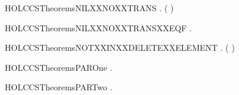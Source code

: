 \newcommand{\HOLCCSTheoremsLENGTHXXDELETEXXELEMENTXXLEQ}{\UseVerbatim{HOLCCSTheoremsLENGTHXXDELETEXXELEMENTXXLEQ}}
\begin{SaveVerbatim}{HOLCCSTheoremsNILXXNOXXTRANS}
\HOLTokenTurnstile{} \HOLSymConst{\HOLTokenForall{}} . \HOLSymConst{\HOLTokenNeg{}}( \HOLTokenTransBegin{}\HOLTokenTransEnd {})
\end{SaveVerbatim}
\newcommand{\HOLCCSTheoremsNILXXNOXXTRANS}{\UseVerbatim{HOLCCSTheoremsNILXXNOXXTRANS}}
\begin{SaveVerbatim}{HOLCCSTheoremsNILXXNOXXTRANSXXEQF}
\HOLTokenTurnstile{} \HOLSymConst{\HOLTokenForall{}} .  \HOLTokenTransBegin{}\HOLTokenTransEnd {} \HOLSymConst{\HOLTokenEquiv{}} 
\end{SaveVerbatim}
\newcommand{\HOLCCSTheoremsNILXXNOXXTRANSXXEQF}{\UseVerbatim{HOLCCSTheoremsNILXXNOXXTRANSXXEQF}}
\begin{SaveVerbatim}{HOLCCSTheoremsNOTXXINXXDELETEXXELEMENT}
\HOLTokenTurnstile{} \HOLSymConst{\HOLTokenForall{}} . \HOLSymConst{\HOLTokenNeg{}}  (  )
\end{SaveVerbatim}
\newcommand{\HOLCCSTheoremsNOTXXINXXDELETEXXELEMENT}{\UseVerbatim{HOLCCSTheoremsNOTXXINXXDELETEXXELEMENT}}
\begin{SaveVerbatim}{HOLCCSTheoremsPAROne}
\HOLTokenTurnstile{} \HOLSymConst{\HOLTokenForall{}}   .  \HOLTokenTransBegin{}\HOLTokenTransEnd {} \HOLSymConst{\HOLTokenImp{}}  \HOLSymConst{\ensuremath{\parallel}}  \HOLTokenTransBegin{}\HOLTokenTransEnd {} \HOLSymConst{\ensuremath{\parallel}} 
\end{SaveVerbatim}
\newcommand{\HOLCCSTheoremsPAROne}{\UseVerbatim{HOLCCSTheoremsPAROne}}
\begin{SaveVerbatim}{HOLCCSTheoremsPARTwo}
\HOLTokenTurnstile{} \HOLSymConst{\HOLTokenForall{}}   .  \HOLTokenTransBegin{}\HOLTokenTransEnd {} \HOLSymConst{\HOLTokenImp{}}  \HOLSymConst{\ensuremath{\parallel}}  \HOLTokenTransBegin{}\HOLTokenTransEnd {} \HOLSymConst{\ensuremath{\parallel}} 
\end{SaveVerbatim}
